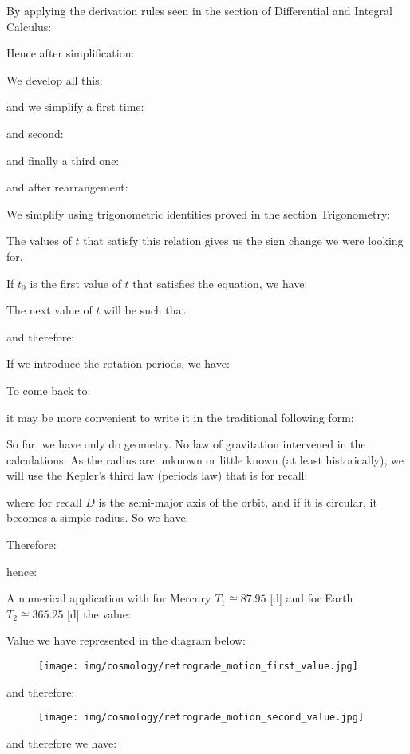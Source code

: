 	By applying the derivation rules seen in the section of Differential and Integral Calculus:
	
	Hence after simplification:
	
	We develop all this:
	
	and we simplify a first time:
	
	and second:
	
	and finally a third one:
	
	and after rearrangement:
	
	We simplify using trigonometric identities proved in the section  Trigonometry:
	
	The values of $t$ that satisfy this relation gives us the sign change we were looking for.

	If $t_0$ is the first value of $t$ that satisfies the equation, we have:
	
	The next value of $t$ will be such that:
	
	and therefore:
	
	If we introduce the rotation periods, we have:
	
	To come back to:
	
	it may be more convenient to write it in the traditional following form:
	
	So far, we have only do geometry. No law of gravitation intervened in the calculations. As the radius are unknown or little known (at least historically), we will use the Kepler's third law (periods law) that is for recall:
	
	where for recall $D$ is the semi-major axis of the orbit, and if it is circular, it becomes a simple radius. So we have:	
	
	Therefore:
	
	hence:
	
	A numerical application with for Mercury $T_1\cong 87.95$ [d] and for Earth $T_2\cong 365.25$ [d] the value:
	
	Value we have represented in the diagram below:
	\begin{figure}[H]
		\begin{center}
		\texttt{[image: img/cosmology/retrograde\_motion\_first\_value.jpg]}
		\end{center}	
	\end{figure}
	and therefore:
	\begin{figure}[H]
		\begin{center}
		\texttt{[image: img/cosmology/retrograde\_motion\_second\_value.jpg]}
		\end{center}	
	\end{figure}
	and therefore we have:
	
